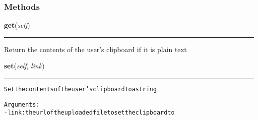     \label{lib:clipboard:Clipboard}


  \subsubsection{Methods}

    \label{lib:clipboard:Clipboard:get}

    \vspace{0.5ex}

\hspace{.8\funcindent}\begin{boxedminipage}{\funcwidth}

    \raggedright \textbf{get}(\textit{self})

    \vspace{-1.5ex}

    \rule{\textwidth}{0.5\fboxrule}
\setlength{\parskip}{2ex}
    Return the contents of the user's clipboard if it is plain text

\setlength{\parskip}{1ex}
    \end{boxedminipage}

    \label{lib:clipboard:Clipboard:set}

    \vspace{0.5ex}

\hspace{.8\funcindent}\begin{boxedminipage}{\funcwidth}

    \raggedright \textbf{set}(\textit{self}, \textit{link})

    \vspace{-1.5ex}

    \rule{\textwidth}{0.5\fboxrule}
\setlength{\parskip}{2ex}
\begin{alltt}

Set the contents of the user's clipboard to a string

Arguments:
- link: the url of the uploaded file to set the clipboard to
\end{alltt}

\setlength{\parskip}{1ex}
    \end{boxedminipage}


